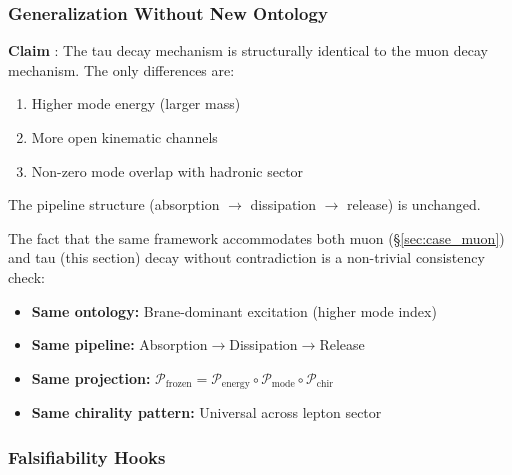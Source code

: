 
\subsubsection{Generalization Without New Ontology}

\begin{tcolorbox}[mechanism, title={Universality Claim}]
\textbf{Claim} \tagDc{}: The tau decay mechanism is structurally identical to
the muon decay mechanism. The only differences are:
\begin{enumerate}[nosep]
  \item Higher mode energy (larger mass)
  \item More open kinematic channels
  \item Non-zero mode overlap with hadronic sector
\end{enumerate}
The pipeline structure (absorption $\to$ dissipation $\to$ release) is unchanged.
\end{tcolorbox}

The fact that the same framework accommodates both muon (\S\ref{sec:case_muon})
and tau (this section) decay without contradiction is a non-trivial
consistency check:

\begin{itemize}[nosep]
    \item \textbf{Same ontology:} Brane-dominant excitation (higher mode index)
    \item \textbf{Same pipeline:} Absorption$\to$Dissipation$\to$Release
    \item \textbf{Same projection:} $\mathcal{P}_{\mathrm{frozen}} =
          \mathcal{P}_{\mathrm{energy}} \circ \mathcal{P}_{\mathrm{mode}}
          \circ \mathcal{P}_{\mathrm{chir}}$
    \item \textbf{Same chirality pattern:} Universal across lepton sector
\end{itemize}


\subsubsection{Falsifiability Hooks}

